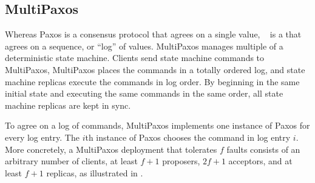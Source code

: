 
\subsection{MultiPaxos}
Whereas Paxos is a consensus protocol that agrees on a single value,
~\cite{lamport1998part, van2015paxos} is a  that agrees on a sequence, or ``log'' of values.
MultiPaxos manages multiple  of a deterministic state
machine. Clients send state machine commands to MultiPaxos, MultiPaxos places
the commands in a totally ordered log, and state machine replicas execute the
commands in log order. By beginning in the same initial state and executing the
same commands in the same order, all state machine replicas are kept in sync.
%
%
%

{}

To agree on a log of commands, MultiPaxos implements one instance of Paxos for
every log entry. The $i$th instance of Paxos chooses the command in log entry
$i$. More concretely, a MultiPaxos deployment that tolerates $f$ faults
consists of an arbitrary number of clients, at least $f+1$ proposers, $2f+1$
acceptors, and at least $f+1$ replicas, as illustrated in
.

